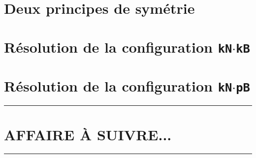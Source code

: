 \documentclass[12pt]{amsart}
\begin{document}
\section{Deux principes de symétrie}






\section{Résolution de la configuration \texttt{kN$\cdot$kB}}







\section{Résolution de la configuration \texttt{kN$\cdot$pB}}









\bigskip

\hrule

\section{AFFAIRE À SUIVRE...}

\bigskip

\hrule



%
%
%
%

%
%
%
%
%
%
%
%
%
%
\end{document}

